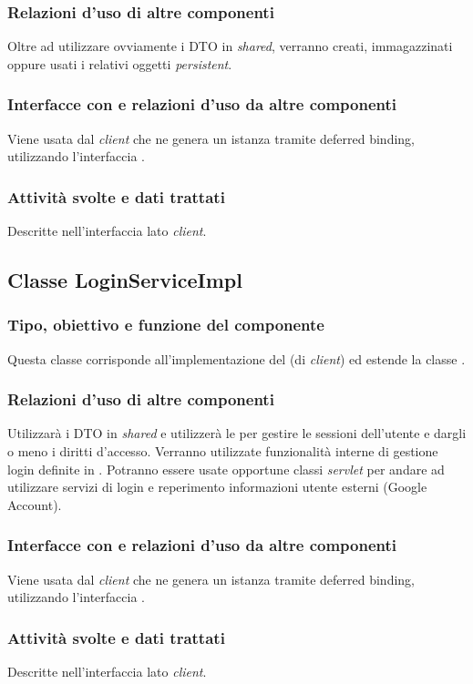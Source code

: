 \subsubsection*{Relazioni d'uso di altre componenti}
Oltre ad utilizzare ovviamente i DTO in \emph{shared}, verranno creati,
immagazzinati oppure usati i relativi oggetti \emph{persistent}.
\subsubsection*{Interfacce con e relazioni d'uso da altre componenti}
Viene usata dal \emph{client} che ne genera un istanza tramite deferred binding,
utilizzando l'interfaccia .
\subsubsection*{Attivit\`a svolte e dati trattati}
Descritte nell'interfaccia lato \emph{client}.

\subsection{Classe LoginServiceImpl}
\subsubsection*{Tipo, obiettivo e funzione del componente}
Questa classe corrisponde all'implementazione del  (di
\emph{client}) ed estende la classe .
\subsubsection*{Relazioni d'uso di altre componenti}
Utilizzar\`a i DTO in \emph{shared} e utilizzer\`a le  per
gestire le sessioni dell'utente e dargli o meno i diritti d'accesso.
Verranno utilizzate funzionalit\`a interne di gestione login definite in
. Potranno essere usate opportune classi \emph{servlet} per
andare ad utilizzare servizi di login e reperimento informazioni utente esterni
(Google Account).
\subsubsection*{Interfacce con e relazioni d'uso da altre componenti}
Viene usata dal \emph{client} che ne genera un istanza tramite deferred binding,
utilizzando l'interfaccia .
\subsubsection*{Attivit\`a svolte e dati trattati}
Descritte nell'interfaccia lato \emph{client}.


